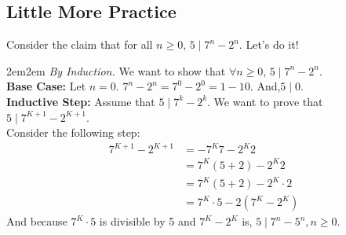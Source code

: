 \documentclass[10pt,oneside]{book}
\newcommand{\gspc}{\vspace{0.13cm}} %
\newcommand{\gline}{\gspc\\} %
\let\endoldproof\endproof
\renewenvironment{proof}[1][\proofname]
  {\vspace{0.2cm}\begin{adjustwidth}{2em}{2em}
   \oldproof[#1]}
  {\endoldproof
   \end{adjustwidth}}
\begin{document}
\subsection*{Little More Practice}
Consider the claim that for all $n\ge 0$, $5\mid 7^n - 2^n$.
Let's do it!
\begin{proof}
  \textit{By Induction.} We want to show that $\forall n \ge 0$, $5\mid 7^n - 2^n$.\gline
  \textbf{Base Case: }Let $n =0$. $7^n - 2^n = 7^0-2^0 = 1 - 1 0$. And,$5\mid 0$.  \gline
  \textbf{Inductive Step: }Assume that $5\mid 7^k - 2^k$. We want to prove that $5\mid 7^{K+1} - 2^{K+1}$.\gline
  Consider the following step:
  \begin{align*}
    7^{K+1}-2^{K+1}&=-7^K7 - 2^K2\\
    &=7^K(5+2) - 2^K2\\
    &= 7^K(5+2) - 2^K\cdot 2\\
    &= 7^K\cdot 5 - 2(7^K - 2^K)
  \end{align*}
  And because $7^K\cdot 5$ is divisible by 5 and $7^K-2^K$ is, $5\mid 7^n-5^n, n\ge 0$.
\end{proof}
\end{document}
